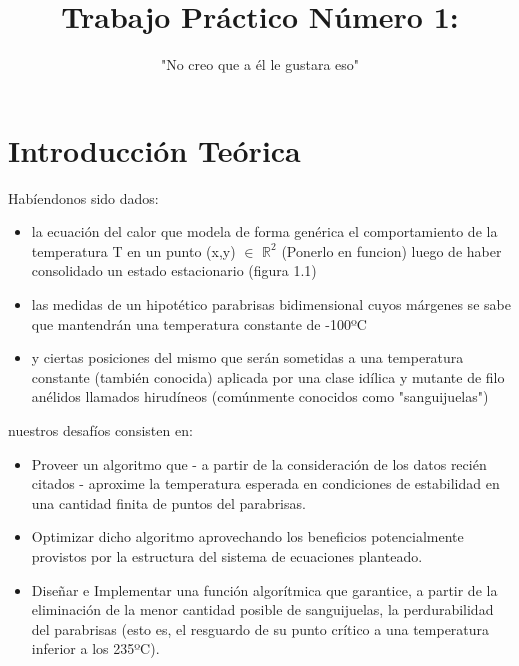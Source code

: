 \documentclass[double,12pt]{beavtex}
\title{Trabajo Pr\'actico N\'umero 1:}
\subtitle{"No creo que a \'el le gustara eso"}
\begin{document}
\maketitle
\mainmatter


\chapter{Introducci\'on Te\'orica}


Hab\'iendonos sido dados:

\begin{itemize}
\item la ecuaci\'on del calor que modela de forma gen\'erica el comportamiento de la temperatura T en un punto (x,y) $\in$ $\mathbb{R}^2$ (Ponerlo en funcion) luego de haber consolidado un estado estacionario (figura 1.1)

\item las medidas de un hipot\'etico parabrisas bidimensional cuyos m\'argenes se sabe que mantendr\'an una temperatura constante de -100ºC 

\item y ciertas posiciones del mismo que ser\'an sometidas a una temperatura constante (tambi\'en conocida) aplicada por  una clase id\'ilica y mutante de filo an\'elidos llamados hirud\'ineos (com\'unmente conocidos como "sanguijuelas") 

\end{itemize}

nuestros desaf\'ios consisten en:

\begin{itemize}

\item Proveer un algoritmo que - a partir de la consideraci\'on de los datos reci\'en citados - aproxime la temperatura esperada en condiciones de estabilidad en una cantidad finita de puntos del parabrisas. 

\item Optimizar dicho algoritmo aprovechando los beneficios potencialmente provistos por la estructura del sistema de ecuaciones planteado.

\item Dise\~nar e Implementar una funci\'on algor\'itmica que garantice, a partir de la eliminaci\'on de la menor cantidad posible de sanguijuelas, la perdurabilidad del parabrisas (esto es, el resguardo de su punto cr\'itico a una temperatura inferior a los 235ºC).
\end{itemize}
\end{document}
